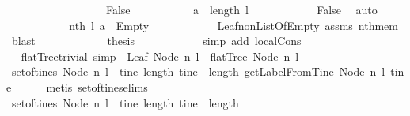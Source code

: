 \begin{isabellebody}
\ \ \ \ \ \ \isamarkupfalse%
\ \isanewline
\ \ \ \ \ \ \ \ \isamarkupfalse%
\ False\ \isanewline
\ \ \ \ \ \ \ \ \isamarkupfalse%
\ {\isachardoublequoteopen}a\ {\isacharless}\ length\ l{\isachardoublequoteclose}\isanewline
\ \ \ \ \ \ \ \ \ \ \isamarkupfalse%
\ False\ \isamarkupfalse%
\ auto\isanewline
\ \ \ \ \ \ \ \ \isamarkupfalse%
\ \isamarkupfalse%
\ {\isachardoublequoteopen}nth\ l\ a\ {\isacharequal}\ Empty{\isachardoublequoteclose}\isanewline
\ \ \ \ \ \ \ \ \ \ \isamarkupfalse%
\ Leaf{\isacharunderscore}non{\isacharunderscore}ListOfEmpty\ assms\ nth{\isacharunderscore}mem\ \isamarkupfalse%
\ blast\ \isanewline
\ \ \ \ \ \ \ \ \isamarkupfalse%
\ \isamarkupfalse%
\ {\isacharquery}thesis\isanewline
\ \ \ \ \ \ \ \ \ \ \isamarkupfalse%
\ {\isacharparenleft}simp\ add{\isacharcolon}\ local{\isachardot}Cons{\isacharparenright}\ \ \ \ \ \ \ \ \ \isanewline
\ \ \ \ \ \ \isamarkupfalse%
\isanewline
\ \ \isamarkupfalse%
%
\endisatagproof
{\isafoldproof}%
%
\isadelimproof
\isanewline
%
\endisadelimproof
\ \isanewline
{}\isamarkupfalse%
\ flatTree{\isacharunderscore}trivial\ {\isacharbrackleft}simp{\isacharbrackright}{\isacharcolon}\ \ {\isachardoublequoteopen}Leaf\ {\isacharparenleft}Node\ n\ l{\isacharparenright}{\isachardoublequoteclose}\ \ {\isachardoublequoteopen}flatTree\ {\isacharparenleft}Node\ n\ l{\isacharparenright}{\isachardoublequoteclose}\isanewline
%
\isadelimproof
%
\endisadelimproof
%
\isatagproof
{}\isamarkupfalse%
\ {\isacharminus}\isanewline
\ \ \isamarkupfalse%
\ {\isachardoublequoteopen}set{\isacharunderscore}of{\isacharunderscore}tines\ {\isacharparenleft}Node\ n\ l{\isacharparenright}\ {\isacharequal}\ {\isacharbraceleft}tine{\isachardot}\ length\ tine\ {\isacharequal}\ length\ {\isacharparenleft}getLabelFromTine\ {\isacharparenleft}Node\ n\ l{\isacharparenright}\ tine{\isacharparenright}{\isacharbraceright}{\isachardoublequoteclose}\isanewline
\ \ \ \ \isamarkupfalse%
\ {\isacharparenleft}metis\ set{\isacharunderscore}of{\isacharunderscore}tines{\isachardot}elims{\isacharparenright}\isanewline
\ \ \isamarkupfalse%
\ \isamarkupfalse%
\ {\isachardoublequoteopen}set{\isacharunderscore}of{\isacharunderscore}tines\ {\isacharparenleft}Node\ n\ l{\isacharparenright}\ {\isacharequal}\ {\isacharbraceleft}tine{\isachardot}\ length\ tine\ {\isacharequal}\ length\ {\isacharbrackleft}{\isacharbrackright}{\isacharbraceright}{\isachardoublequoteclose}\isanewline

\end{isabellebody}
